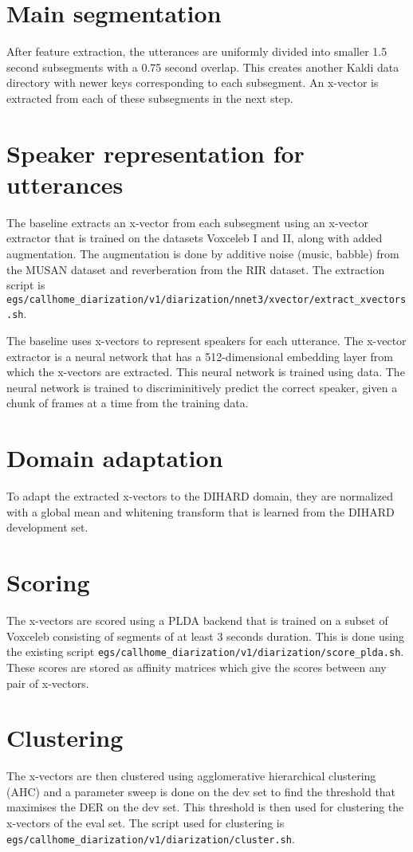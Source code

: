 \section{Main segmentation}
After feature extraction, the utterances are uniformly divided into smaller 1.5 second subsegments with a 0.75 second overlap. This creates another Kaldi data directory with newer keys corresponding to each subsegment. An x-vector is extracted from each of these subsegments in the next step.

\section{Speaker representation for utterances}
The baseline extracts an x-vector from each subsegment using an x-vector extractor that is trained on the datasets Voxceleb I and II, along with added augmentation. The augmentation is done by additive noise (music, babble) from the MUSAN dataset and reverberation from the RIR dataset. The extraction script is \texttt{egs/callhome\_diarization/v1/diarization/nnet3/xvector/extract\_xvectors.sh}.

The baseline uses x-vectors \cite{snyder2018x} to represent speakers for each utterance. The x-vector extractor is a neural network that has a 512-dimensional embedding layer from which the x-vectors are extracted. This neural network is trained using data. The neural network is trained to discriminitively predict the correct speaker, given a chunk of frames at a time from the training data.

\section{Domain adaptation}
To adapt the extracted x-vectors to the DIHARD domain, they are normalized with a global mean and whitening transform that is learned from the DIHARD development set.

\section{Scoring}
The x-vectors are scored using a PLDA backend that is trained on a subset of Voxceleb consisting of segments of at least 3 seconds duration. This is done using the existing script \texttt{egs/callhome\_diarization/v1/diarization/score\_plda.sh}. These scores are stored as affinity matrices which give the scores between any pair of x-vectors.

\section{Clustering}
The x-vectors are then clustered using agglomerative hierarchical clustering (AHC) and a parameter sweep is done on the dev set to find the threshold that maximises the DER on the dev set. This threshold is then used for clustering the x-vectors of the eval set. The script used for clustering is \texttt{egs/callhome\_diarization/v1/diarization/cluster.sh}.

